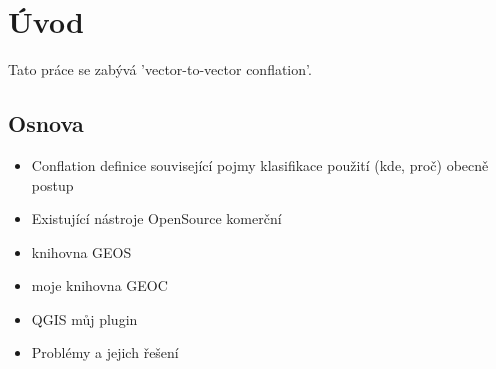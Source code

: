 \chapter{Úvod}
\label{1-uvod}

Tato práce se zabývá 'vector-to-vector conflation'.

\section{Osnova}

\begin{itemize}
 \item Conflation
  \subitem definice
  \subitem související pojmy
  \subitem klasifikace
  \subitem použití (kde, proč)
  \subitem obecně postup
 \item Existující nástroje
  \subitem OpenSource
  \subitem komerční
 \item knihovna GEOS
 \item moje knihovna GEOC
 \item QGIS
  \subitem můj plugin
 \item Problémy a jejich řešení
\end{itemize}




